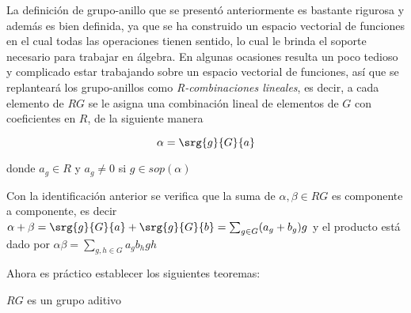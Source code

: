 La definición de grupo-anillo que se presentó anteriormente es bastante rigurosa y además es bien definida, ya que se ha construido un espacio vectorial de funciones en el cual todas las operaciones tienen sentido, lo cual le brinda el soporte necesario para trabajar en álgebra. En algunas ocasiones resulta un poco tedioso y complicado estar trabajando sobre un espacio vectorial de funciones, así que se replanteará los grupo-anillos como \textit{R-combinaciones lineales}, es decir, a cada elemento de $RG$ se le asigna una combinación lineal de elementos de $G$ con coeficientes en $R$, de la siguiente manera

\begin{equation}
\alpha = \srg{g}{G}{a}
\end{equation}


donde $a_g \in R$ y $a_g \neq 0$ si $g \in sop(\alpha)$


\begin{nota}
Con la identificación anterior se verifica que la suma de $\alpha, \beta \in RG$ es componente a componente, es decir $\alpha + \beta= \srg{g}{G}{a}+\srg{g}{G}{b}= \sum_{g\in G} (a_g+b_g)g $ y el producto está dado por $\alpha\beta=\sum_{g,h\in G}a_gb_hgh$

\end{nota}


Ahora es práctico establecer los siguientes teoremas:

\begin{teorema}\label{grupo}
$RG$ es un grupo aditivo

\end{teorema}

